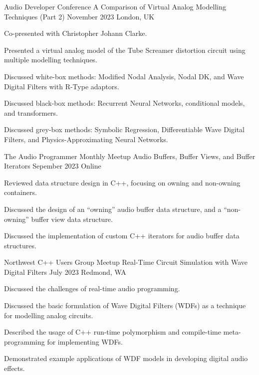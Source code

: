 \begin{cventries}
  \cventry
    {Audio Developer Conference} %
    {A Comparison of Virtual Analog Modelling Techniques (Part 2)} %
    {November 2023} %
    {London, UK} %
    {
      \begin{cvitems} %
        \item {Co-presented with Christopher Johann Clarke.}
        \item {Presented a virtual analog model of the Tube Screamer distortion circuit using multiple modelling techniques.}
        \item {Discussed white-box methods: Modified Nodal Analysis, Nodal DK, and Wave Digital Filters with R-Type adaptors.}
        \item {Discussed black-box methods: Recurrent Neural Networks, conditional models, and transformers.}
        \item {Discussed grey-box methods: Symbolic Regression, Differentiable Wave Digital Filters, and Physics-Approximating Neural Networks.}
      \end{cvitems}
    }

\cventry
{The Audio Programmer Monthly Meetup} %
{Audio Buffers, Buffer Views, and Buffer Iterators} %
{Sepember 2023} %
{Online} %
{
  \begin{cvitems} %
    \item {Reviewed data structure design in C++, focusing on owning and non-owning containers.}
    \item {Discussed the design of an ``owning'' audio buffer data structure, and a ``non-owning'' buffer view data structure.}
    \item {Discussed the implementation of custom C++ iterators for audio buffer data structures.}
  \end{cvitems}
}

  \cventry
    {Northwest C++ Users Group Meetup} %
    {Real-Time Circuit Simulation with Wave Digital Filters} %
    {July 2023} %
    {Redmond, WA} %
    {
      \begin{cvitems} %
        \item {Discussed the challenges of real-time audio programming.}
        \item {Discussed the basic formulation of Wave Digital Filters (WDFs) as a technique for modelling analog circuits.}
        \item {Described the usage of C++ run-time polymorphism and compile-time meta-programming for implementing WDFs.}
        \item {Demonstrated example applications of WDF models in developing digital audio effects.}
      \end{cvitems}
    }


\end{cventries}
